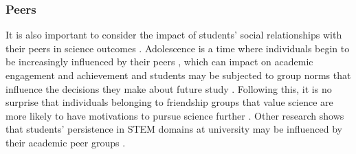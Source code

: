 \subsubsection{Peers}
It is also important to consider the impact of students' social relationships with their peers in science outcomes \citep{osborne2003attitudes}. Adolescence is a time where individuals begin to be increasingly influenced by their peers \citep{douvan1966adolescent}, which can impact on academic engagement and achievement \citep{ryan2000peer} and students may be subjected to group norms that influence the decisions they make about future study \citep{brown1986perceptions}. Following this, it is no surprise that individuals belonging to friendship groups that value science are more likely to have motivations to pursue science further \citep{robnett2013friendship}. Other research shows that students' persistence in STEM domains at university may be influenced by their academic peer groups \citep{Ost_2010}.


